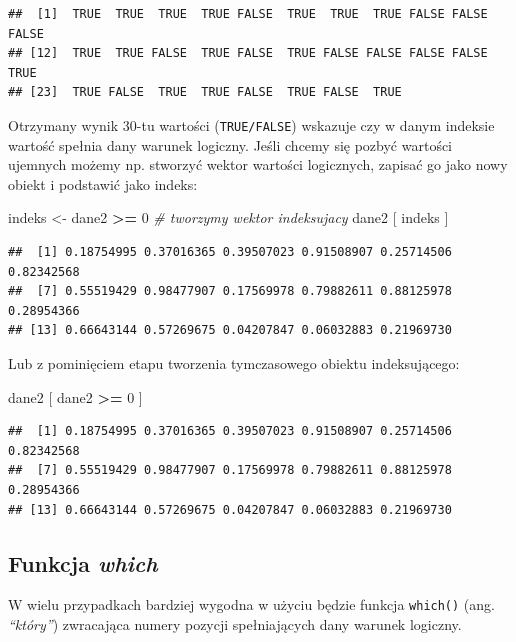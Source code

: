 \documentclass[]{book}
\newenvironment{Shaded}{\begin{snugshade}}{\end{snugshade}}
\newcommand{\DecValTok}[1]{\textcolor[rgb]{0.00,0.00,0.81}{#1}}
\newcommand{\StringTok}[1]{\textcolor[rgb]{0.31,0.60,0.02}{#1}}
\newcommand{\CommentTok}[1]{\textcolor[rgb]{0.56,0.35,0.01}{\textit{#1}}}
\newcommand{\OperatorTok}[1]{\textcolor[rgb]{0.81,0.36,0.00}{\textbf{#1}}}
\newcommand{\NormalTok}[1]{#1}
\theoremstyle{definition}
\theoremstyle{definition}
\theoremstyle{definition}
\theoremstyle{remark}
\begin{document}
\begin{verbatim}
##  [1]  TRUE  TRUE  TRUE  TRUE FALSE  TRUE  TRUE  TRUE FALSE FALSE FALSE
## [12]  TRUE  TRUE FALSE  TRUE FALSE  TRUE FALSE FALSE FALSE FALSE  TRUE
## [23]  TRUE FALSE  TRUE  TRUE FALSE  TRUE FALSE  TRUE
\end{verbatim}

Otrzymany wynik 30-tu wartości (\texttt{TRUE/FALSE}) wskazuje czy w
danym indeksie wartość spełnia dany warunek logiczny. Jeśli chcemy się
pozbyć wartości ujemnych możemy np. stworzyć wektor wartości logicznych,
zapisać go jako nowy obiekt i podstawić jako indeks:

\begin{Shaded}
\begin{Highlighting}[]
\NormalTok{indeks <-}\StringTok{  }\NormalTok{dane2 }\OperatorTok{>=}\StringTok{ }\DecValTok{0}        \CommentTok{#   tworzymy wektor indeksujacy}
\NormalTok{dane2 [ indeks ]}
\end{Highlighting}
\end{Shaded}

\begin{verbatim}
##  [1] 0.18754995 0.37016365 0.39507023 0.91508907 0.25714506 0.82342568
##  [7] 0.55519429 0.98477907 0.17569978 0.79882611 0.88125978 0.28954366
## [13] 0.66643144 0.57269675 0.04207847 0.06032883 0.21969730
\end{verbatim}

Lub z pominięciem etapu tworzenia tymczasowego obiektu indeksującego:

\begin{Shaded}
\begin{Highlighting}[]
\NormalTok{dane2 [ dane2 }\OperatorTok{>=}\StringTok{ }\DecValTok{0}\NormalTok{ ]}
\end{Highlighting}
\end{Shaded}

\begin{verbatim}
##  [1] 0.18754995 0.37016365 0.39507023 0.91508907 0.25714506 0.82342568
##  [7] 0.55519429 0.98477907 0.17569978 0.79882611 0.88125978 0.28954366
## [13] 0.66643144 0.57269675 0.04207847 0.06032883 0.21969730
\end{verbatim}

\subsection{\texorpdfstring{Funkcja
\emph{which}}{Funkcja which}}\label{funkcja-which}

W wielu przypadkach bardziej wygodna w użyciu będzie funkcja
\texttt{which()} (ang. \emph{``który''}) zwracająca numery pozycji
spełniających dany warunek logiczny.
\end{document}

